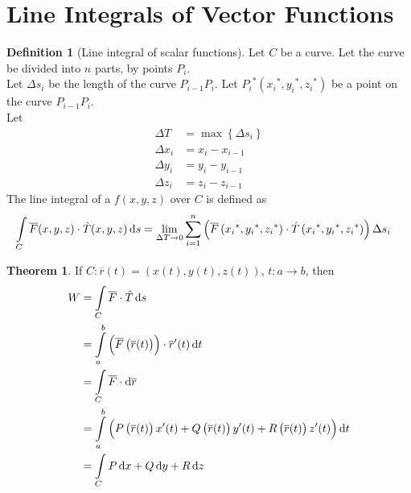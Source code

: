 \documentclass[fleqn, a4paper, 12pt, twoside]{article}
\theoremstyle{definition}
\newtheorem{definition}{Definition}
\theoremstyle{theorem}
\newtheorem{theorem}{Theorem}
\begin{document}
{\section{Line Integrals of Vector Functions}

\begin{definition}[Line integral of scalar functions]
	Let $C$ be a curve.
	Let the curve be divided into $n$ parts, by points $P_i$.\\
	Let $\Delta s_i$ be the length of the curve $P_{i - 1} P_i$.
	Let ${P_i}^*\left( {x_i}^* , {y_i}^* , {z_i}^* \right)$ be a point on the curve $P_{i - 1} P_i$.\\
	Let 
	\begin{align*}
		\Delta T   & = \max\left\{ \Delta s_i \right\} \\
		\Delta x_i & = x_i - x_{i - 1}                 \\
		\Delta y_i & = y_i - y_{i - 1}                 \\
		\Delta z_i & = z_i - z_{i - 1}
	\end{align*}
	The line integral of a $f(x,y,z)$ over $C$ is defined as
	\begin{align*}
		\int\limits_{C} \overline{F}(x,y,z) \cdot \hat{T}(x,y,z) \dif s & = \lim\limits_{\Delta T \to 0} \sum\limits_{i = 1}^{n} \left( \overline{F}\left( {x_i}^* , {y_i}^* , {z_i}^* \right) \cdot \hat{T}\left( {x_i}^* , {y_i}^* , {z_i}^* \right) \right) \Delta s_i
	\end{align*}
\end{definition}

\begin{theorem}
	If $C : \overline{r}(t) = \left( x(t) , y(t) , z(t) \right)$, $t : a \to b$, then
	\begin{align*}
		W & =\int\limits_{C} \overline{F} \cdot \hat{T} \dif s                                                                                                                \\
                  & = \int\limits_{a}^{b} \left( \overline{F}\left( \overline{r}(t) \right) \right) \cdot {\overline{r}}'(t) \dif t                                                           \\
                  & = \int\limits_{C} \overline{F} \cdot \dif \overline{r}                                                                                                            \\
                  & = \int\limits_{a}^{b} \left( P\left( \overline{r}(t) \right) x'(t) + Q\left( \overline{r}(t) \right) y'(t) + R\left( \overline{r}(t) \right) z'(t) \right) \dif t \\
                  & = \int\limits_{C} P \dif x + Q \dif y + R \dif z
	\end{align*}
\end{theorem}

}
\end{document}
